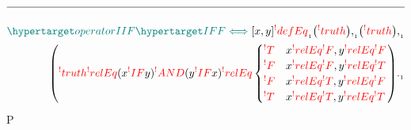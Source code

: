 \documentclass[a4paper]{article}
\newcommand{\n}{\\[1.5ex] \hline \nonumber \\[0ex]}
\newcommand{\m}{\nonumber \\}
\def\ml{\mleft}
\def\mr{\mright}
\newcommand{\cusand}{,}
\newcommand{\cusend}{.}
\newcommand{\cusnum}[2]{{#1}_{{\phantom{ }}_{#2}}}
\begin{document}
\begin{tcolorbox}
\begin{align}
    \n \dfn{operatorIIF} [\dfn{IFF}[\iff]][x, y] \cusnum{\rfr{defEq}}{1} \ml(\rfr{truth} [x][]\mr) \cusnum{\cusand}{1} \ml(\rfr{truth} [y][]\mr) \cusnum{\cusand}{1}
\m \ml(\rfr{truth} [x \rfr{IFF} y][] \rfr{relEq} (x \rfr{IF} y) \rfr{AND} (y \rfr{IF} x) \rfr{relEq} \begin{cases} \rfr{T} & x \rfr{relEq} \rfr{F} \cusand y \rfr{relEq} \rfr{F} \\ \rfr{F} & x \rfr{relEq} \rfr{F} \cusand y \rfr{relEq} \rfr{T} \\ \rfr{F} & x \rfr{relEq} \rfr{T} \cusand y \rfr{relEq} \rfr{F} \\ \rfr{T} & x \rfr{relEq} \rfr{T} \cusand y \rfr{relEq} \rfr{T} \end{cases}\mr) \cusnum{\cusend}{1}
\end{align}P
\end{tcolorbox}
\end{document}
